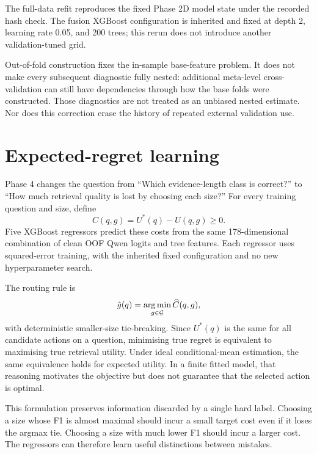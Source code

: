 The full-data refit reproduces the fixed Phase 2D model state under the
recorded hash check. The fusion XGBoost configuration is inherited
and fixed at depth 2, learning rate 0.05, and 200 trees; this rerun does
not introduce another validation-tuned grid.

Out-of-fold construction fixes the in-sample base-feature problem.
It does not make every subsequent diagnostic fully nested: additional
meta-level cross-validation can still have dependencies through how
the base folds were constructed. Those diagnostics are not treated
as an unbiased nested estimate. Nor does this correction erase the
history of repeated external validation use.

\section{Expected-regret learning}
\label{sec:regret}
Phase 4 changes the question from \enquote{Which evidence-length class
is correct?} to \enquote{How much retrieval quality is lost by choosing
each size?} For every training question and size, define
\begin{equation}
C(q,g)=U^*(q)-U(q,g)\geq 0.
\label{eq:regret}
\end{equation}
Five XGBoost regressors predict these costs from the same 178-dimensional
combination of clean OOF Qwen logits and tree features. Each regressor
uses squared-error training, with the inherited fixed configuration
and no new hyperparameter search.

The routing rule is
\begin{equation}
\hat g(q)=\underset{g\in\mathcal{G}}{\arg\min}\,
\widehat C(q,g),
\label{eq:regretrule}
\end{equation}
with deterministic smaller-size tie-breaking. Since $U^*(q)$ is the
same for all candidate actions on a question, minimising true regret
is equivalent to maximising true retrieval utility. Under ideal
conditional-mean estimation, the same equivalence holds for expected
utility. In a finite fitted model, that reasoning motivates the
objective but does not guarantee that the selected action is optimal.

This formulation preserves information discarded by a single hard
label. Choosing a size whose F1 is almost maximal should incur a
small target cost even if it loses the argmax tie. Choosing a size
with much lower F1 should incur a larger cost. The regressors can
therefore learn useful distinctions between mistakes.

